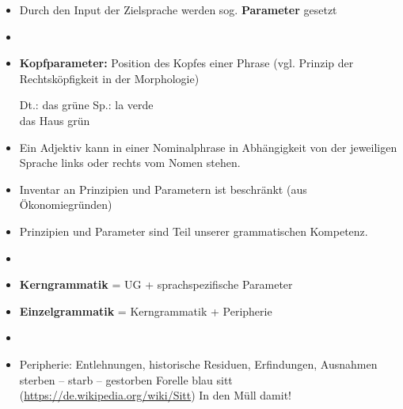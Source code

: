 \begin{frame}

\begin{itemize}

	\begin{block}{Parameter}
	Einzelsprachlich spezifische Regeln, die Möglichkeiten darstellen, die universalgrammatischen Prinzipien auszubuchstabieren.
	\end{block}
	
	\item Durch den Input der Zielsprache werden sog. \textbf{Parameter} gesetzt
	\item[]
	\item \textbf{Kopfparameter:} Position des Kopfes einer Phrase (vgl. Prinzip der Rechtsköpfigkeit in der Morphologie)
	
	\eal
	\ex Dt.: das grüne 
	\ex
	\gll Sp.: la  verde\\
		{} das Haus grün\\
	\zl
	
	\item Ein Adjektiv kann in einer Nominalphrase in Abhängigkeit von der jeweiligen Sprache links oder rechts vom Nomen stehen.


\end{itemize}

\end{frame}


\begin{frame}

\begin{itemize}
	\item Inventar an Prinzipien und Parametern ist beschränkt (aus Ökonomiegründen)
	\item Prinzipien und Parameter sind Teil unserer grammatischen Kompetenz.
	\item[]
	\item \textbf{Kerngrammatik} = UG + sprachspezifische Parameter
	\item \textbf{Einzelgrammatik} = Kerngrammatik + Peripherie
	\item[]
	\item Peripherie: Entlehnungen, historische Residuen, Erfindungen, Ausnahmen \citep[vgl.][]{Nolda&Co14a}
	\eal
	\ex sterben -- starb -- gestorben
	\ex Forelle blau
	\ex sitt (\url{https://de.wikipedia.org/wiki/Sitt})
	\ex In den Müll damit!
	\zl
	
\end{itemize}

\nocite{MyP17b}

\end{frame}


